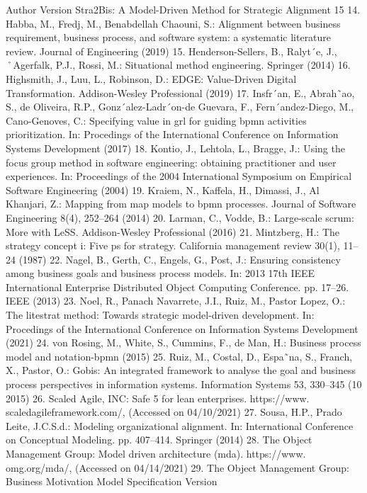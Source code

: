 Author Version
Stra2Bis: A Model-Driven Method for Strategic Alignment 15
14. Habba, M., Fredj, M., Benabdellah Chaouni, S.: Alignment between business requirement, business process, and software system: a systematic literature review.
Journal of Engineering (2019)
15. Henderson-Sellers, B., Ralyt´e, J., ˚Agerfalk, P.J., Rossi, M.: Situational method
engineering. Springer (2014)
16. Highsmith, J., Luu, L., Robinson, D.: EDGE: Value-Driven Digital Transformation.
Addison-Wesley Professional (2019)
17. Insfr´an, E., Abrah˜ao, S., de Oliveira, R.P., Gonz´alez-Ladr´on-de Guevara, F.,
Fern´andez-Diego, M., Cano-Genoves, C.: Specifying value in grl for guiding bpmn
activities prioritization. In: Procedings of the International Conference on Information Systems Development (2017)
18. Kontio, J., Lehtola, L., Bragge, J.: Using the focus group method in software
engineering: obtaining practitioner and user experiences. In: Proceedings of the
2004 International Symposium on Empirical Software Engineering (2004)
19. Kraiem, N., Kaffela, H., Dimassi, J., Al Khanjari, Z.: Mapping from map models
to bpmn processes. Journal of Software Engineering 8(4), 252–264 (2014)
20. Larman, C., Vodde, B.: Large-scale scrum: More with LeSS. Addison-Wesley Professional (2016)
21. Mintzberg, H.: The strategy concept i: Five ps for strategy. California management
review 30(1), 11–24 (1987)
22. Nagel, B., Gerth, C., Engels, G., Post, J.: Ensuring consistency among business
goals and business process models. In: 2013 17th IEEE International Enterprise
Distributed Object Computing Conference. pp. 17–26. IEEE (2013)
23. Noel, R., Panach Navarrete, J.I., Ruiz, M., Pastor Lopez, O.: The litestrat method:
Towards strategic model-driven development. In: Procedings of the International
Conference on Information Systems Development (2021)
24. von Rosing, M., White, S., Cummins, F., de Man, H.: Business process model and
notation-bpmn (2015)
25. Ruiz, M., Costal, D., Espa˜na, S., Franch, X., Pastor, O.: Gobis: An integrated
framework to analyse the goal and business process perspectives in information
systems. Information Systems 53, 330–345 (10 2015)
26. Scaled Agile, INC: Safe 5 for lean enterprises. https://www.
scaledagileframework.com/, (Accessed on 04/10/2021)
27. Sousa, H.P., Prado Leite, J.C.S.d.: Modeling organizational alignment. In: International Conference on Conceptual Modeling. pp. 407–414. Springer (2014)
28. The Object Management Group: Model driven architecture (mda). https://www.
omg.org/mda/, (Accessed on 04/14/2021)
29. The Object Management Group: Business Motivation Model Specification Version
